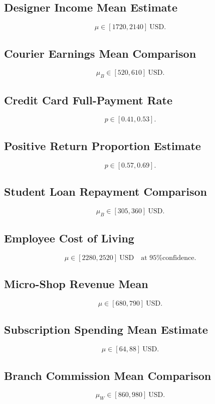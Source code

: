 \subsection*{Designer Income Mean Estimate}
\[\mu \in [1720, 2140]\ \text{USD}.\]

\subsection*{Courier Earnings Mean Comparison}
\[\mu_B \in [520, 610]\ \text{USD}.\]

\subsection*{Credit Card Full-Payment Rate}
\[p \in [0.41, 0.53].\]

\subsection*{Positive Return Proportion Estimate}
\[p \in [0.57, 0.69].\]

\subsection*{Student Loan Repayment Comparison}
\[\mu_B \in [305, 360]\ \text{USD}.\]

\subsection*{Employee Cost of Living}
\[\mu \in [2280, 2520]\ \text{USD} \quad \text{at 95\% confidence.}\]

\subsection*{Micro-Shop Revenue Mean}
\[\mu \in [680, 790]\ \text{USD}.\]

\subsection*{Subscription Spending Mean Estimate}
\[\mu \in [64, 88]\ \text{USD}.\]

\subsection*{Branch Commission Mean Comparison}
\[\mu_W \in [860, 980]\ \text{USD}.\]



